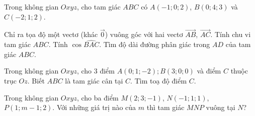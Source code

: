 \begin{vd}
	Trong không gian $Oxyz$, cho tam giác $ABC$ có $A(-1; 0; 2)$, $B(0; 4; 3)$ và $C(-2; 1; 2)$.
	\begin{tasks}
		\task Chỉ ra tọa độ một vectơ (khác $\vec{0}$) vuông góc với hai vectơ $\vec{AB}$, $\vec{AC}$.
		\task Tính chu vi tam giác $ABC$.
		\task Tính $\cos \widehat{BAC}$.
		\task Tìm độ dài đường phân giác trong $AD$ của tam giác $ABC$.
	\end{tasks}
\end{vd}

\begin{vd}
	Trong không gian $Oxyz$, cho 3 điểm $A\left(0;1;-2\right);B\left(3;0;0\right)$ và điểm $C$ thuộc trục $Oz$. Biết $ABC$ là tam giác cân tại $C$. Tìm toạ độ điểm $C$.

\end{vd}

\begin{vd}
	Trong không gian $Oxyz$, cho ba điểm $M\left(2;3;-1\right)$, $N\left(-1;1;1\right)$, $P\left(1;m-1;2\right)$. Với những giá trị nào của $m$ thì tam giác $MNP$ vuông tại $N$?
\end{vd}

